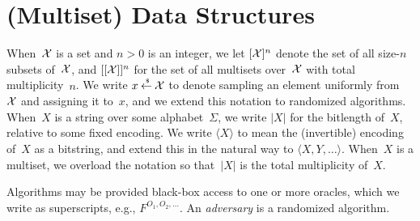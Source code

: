 \newcommand{\qry}{\mathsf{qry}}
\section{(Multiset) Data Structures}

 When~${\cal X}$ is a set and $n>0$ is an
integer, we let $[{\cal X}]^n$ denote the set of all size-$n$ subsets
of~${\cal X}$, and $[[{\cal X}]]^n$ for the set of all multisets
over~${\cal X}$ with total multiplicity~$n$.   We write $x {\:\stackrel{{\scriptscriptstyle \hspace{0.2em}\$}} {\leftarrow}\:} {\cal X}$ to denote
sampling an element uniformly from~${\cal X}$ and assigning it to~$x$,
and we extend this notation to randomized algorithms. When~$X$ is a
string over some alphabet~$\Sigma$, we write $|X|$ for the bitlength
of~$X$, relative to some fixed encoding.  We write $\langle X \rangle$
to mean the (invertible) encoding of~$X$ as a bitstring, and extend
this in the natural way to $\langle X,Y,\ldots \rangle$.
When~$X$ is a multiset, we overload the notation so that~$|X|$ is the total multiplicity
of~$X$.



Algorithms may be provided black-box access to one or more oracles,
which we write as superscripts, e.g., $F^{O_1,O_2,\ldots}$.  An \emph{adversary} is a randomized algorithm.

